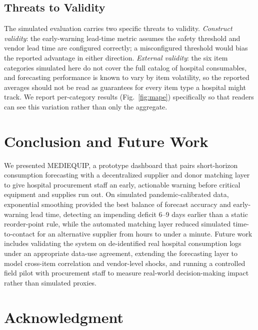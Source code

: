 \documentclass[conference]{IEEEtran}
\begin{document}
\subsection{Threats to Validity}

The simulated evaluation carries two specific threats to validity. \emph{Construct validity}: the early-warning lead-time metric assumes the safety threshold and vendor lead time are configured correctly; a misconfigured threshold would bias the reported advantage in either direction. \emph{External validity}: the six item categories simulated here do not cover the full catalog of hospital consumables, and forecasting performance is known to vary by item volatility, so the reported averages should not be read as guarantees for every item type a hospital might track. We report per-category results (Fig.~\ref{fig:mape}) specifically so that readers can see this variation rather than only the aggregate.


\section{Conclusion and Future Work}

We presented MEDIEQUIP, a prototype dashboard that pairs short-horizon consumption forecasting with a decentralized supplier and donor matching layer to give hospital procurement staff an early, actionable warning before critical equipment and supplies run out. On simulated pandemic-calibrated data, exponential smoothing provided the best balance of forecast accuracy and early-warning lead time, detecting an impending deficit 6--9 days earlier than a static reorder-point rule, while the automated matching layer reduced simulated time-to-contact for an alternative supplier from hours to under a minute. Future work includes validating the system on de-identified real hospital consumption logs under an appropriate data-use agreement, extending the forecasting layer to model cross-item correlation and vendor-level shocks, and running a controlled field pilot with procurement staff to measure real-world decision-making impact rather than simulated proxies.


\section*{Acknowledgment}
\end{document}

